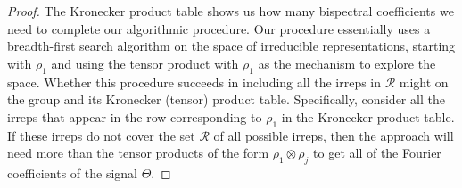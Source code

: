 \begin{proof}

    The Kronecker product table shows us how many bispectral coefficients we need to complete our algorithmic procedure. Our procedure essentially uses a breadth-first search algorithm on the space of irreducible representations, starting with $\rho_1$ and using the tensor product with $\rho_1$ as the mechanism to explore the space. Whether this procedure succeeds in including all the irreps in $\mathcal{R}$ might on the group and its Kronecker (tensor) product table. Specifically, consider all the irreps that appear in the row corresponding to $\rho_1$ in the Kronecker product table. If these irreps do not cover the set $\mathcal{R}$ of all possible irreps, then the approach will need more than the tensor products of the form $\rho_1 \otimes \rho_j$ to get all of the Fourier coefficients of the signal $\Theta$.


\end{proof}
